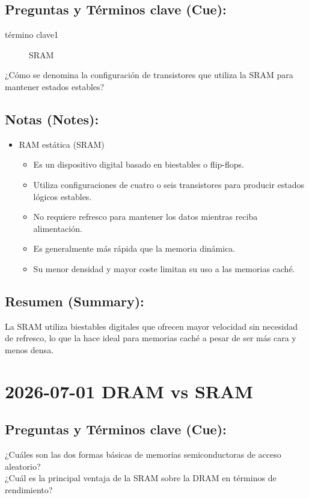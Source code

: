 \documentclass{article}
\begin{document}
\subsection{Preguntas y Términos clave (Cue):}
\label{sec:orgf3520fc}
\begin{description}
\item[{término clave1}] SRAM
\item[{¿Cómo se denomina la configuración de transistores que utiliza la SRAM para mantener estados estables?}] 
\end{description}

\subsection{Notas (Notes):}
\label{sec:org3270f79}
\begin{itemize}
\item RAM estática (SRAM)
\begin{itemize}
\item Es un dispositivo digital basado en biestables o flip-flops.
\item Utiliza configuraciones de cuatro o seis transistores para
producir estados lógicos estables.
\item No requiere refresco para mantener los datos mientras reciba
alimentación.
\item Es generalmente más rápida que la memoria dinámica.
\item Su menor densidad y mayor coste limitan su uso a las memorias
caché.
\end{itemize}
\end{itemize}

\subsection{Resumen (Summary):}
\label{sec:org7a5d34a}
La SRAM utiliza biestables digitales que ofrecen mayor velocidad sin
necesidad de refresco, lo que la hace ideal para memorias caché a
pesar de ser más cara y menos densa.

\section{2026-07-01 DRAM vs SRAM}
\label{sec:org6ee6116}

\subsection{Preguntas y Términos clave (Cue):}
\label{sec:org89f0652}
\begin{description}
\item[{¿Cuáles son las dos formas básicas de memorias semiconductoras de acceso aleatorio?}] 

\item[{¿Cuál es la principal ventaja de la SRAM sobre la DRAM en términos de rendimiento?}] 
\end{description}
\end{document}
